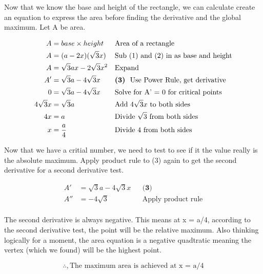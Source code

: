 \documentclass[12pt]{book}
\begin{document}
\begin{enumerate}
\newpage

Now that we know the base and height of the rectangle, we can calculate 
create an equation to express the area before finding the derivative and 
the global maximum. Let A be area.

\addtolength{\jot}{-0.6em}
\begin{align*}
    A &= base \times height && \text{Area of a rectangle}\\
    A &= (a - 2x)(\sqrt3x) && \text{Sub (1) and (2) in as base and height} \\
    A &= \sqrt3ax-2\sqrt3x^2 && \text{Expand} \\
    A' &=  \sqrt3a-4\sqrt3x && \textbf{(3)} \text{\space \space Use Power Rule, get derivative} \\
    0 &=  \sqrt3a-4\sqrt3x && \text{Solve for A' = 0 for critical points}\\
    4\sqrt3x &=  \sqrt3a && \text{Add } 4\sqrt3x \text{ to both sides} \\
    4x &=  a && \text{Divide } \sqrt3 \text{ from both sides} \\
    x &= \dfrac{a}{4} && \text{Divide } 4 \text{ from both sides} \\  
\end{align*}

Now that we have a critial number, we need to test to see 
if it the value really is the absolute maximum. Apply product rule 
to (3) again to get the second derivative for a second derivative test.

\addtolength{\jot}{-0.6em}
\begin{align*}
    A' &=  \sqrt3a-4\sqrt3x && \textbf{(3)} \\
    A'' &=  -4\sqrt3 && \text{Apply product rule}\\
\end{align*}

The second derivative is always negative. This means at x = a/4, 
according to the second derivative test, the point will be the 
relative maximum. Also thinking logically for a moment, the area 
equation is a negative quadtratic meaning the vertex (which we 
found) will be the highest point.

\vspace{0.5cm}
$$\boxed{\therefore, \text{The maximum area is achieved at x = a/4}}$$


\newpage



\end{enumerate}
\end{document}

